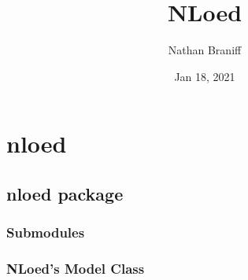\documentclass[letterpaper,10pt,english]{sphinxmanual}
\title{NLoed}
\date{Jan 18, 2021}
\author{Nathan Braniff}
\begin{document}
\pagestyle{empty}
\sphinxmaketitle
\pagestyle{plain}
\sphinxtableofcontents
\pagestyle{normal}
\label{\detokenize{index::doc}}



\chapter{nloed}
\label{\detokenize{modules:nloed}}\label{\detokenize{modules::doc}}

\section{nloed package}
\label{\detokenize{nloed:nloed-package}}\label{\detokenize{nloed::doc}}

\subsection{Submodules}
\label{\detokenize{nloed:submodules}}

\subsection{NLoed’s Model Class}
\label{\detokenize{nloed:module-nloed.model}}\label{\detokenize{nloed:nloed-s-model-class}}
\end{document}
